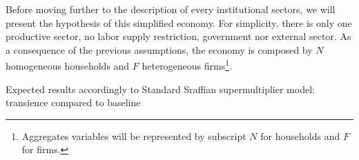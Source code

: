 \documentclass{SelfArx}
\begin{document}
Before moving further to the description of every institutional sectors, we will present the hypothesis of this simplified economy.
For simplicity, there is only one productive sector, no labor supply restriction, government nor external sector.
As a consequence of the previous assumptions, the economy is composed by \(N\) homogeneous households and \(F\) heterogeneous firms\footnote{Aggregates variables will be represented by subscript \(N\) for households and \(F\) for firms.}.



\begin{table*}\centering
\caption{Expected results accordingly to Standard Sraffian supermultiplier model: transience compared to baseline}
\label{Tab_exp_resul_trans:ch_super}
\caption*{\textbf{Source:} Authors' elaboration}
\end{table*}
\end{document}
